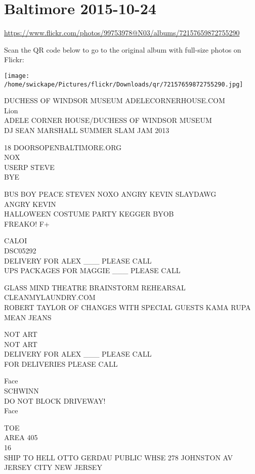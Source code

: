 \documentclass[10pt,letterpaper]{article}
\begin{document}
\section*{Baltimore 2015-10-24}

\url{https://www.flickr.com/photos/99753978@N03/albums/72157659872755290}

Scan the QR code below to go to the original album with full-size photos on Flickr:

\texttt{[image: /home/swickape/Pictures/flickr/Downloads/qr/72157659872755290.jpg]}


DUCHESS OF WINDSOR MUSEUM ADELECORNERHOUSE.COM\\
Lion\\
ADELE CORNER HOUSE/DUCHESS OF WINDSOR MUSEUM\\
DJ SEAN MARSHALL SUMMER SLAM JAM 2013

18 DOORSOPENBALTIMORE.ORG\\
NOX\\
USERP STEVE\\
BYE

BUS BOY PEACE STEVEN NOXO ANGRY KEVIN SLAYDAWG\\
ANGRY KEVIN\\
HALLOWEEN COSTUME PARTY KEGGER BYOB\\
FREAKO!  F+

CALOI\\
DSC05292\\
DELIVERY FOR ALEX \_\_\_ PLEASE CALL\\
UPS PACKAGES FOR MAGGIE \_\_\_ PLEASE CALL

GLASS MIND THEATRE BRAINSTORM REHEARSAL\\
CLEANMYLAUNDRY.COM\\
ROBERT TAYLOR OF CHANGES WITH SPECIAL GUESTS KAMA RUPA\\
MEAN JEANS

NOT ART\\
NOT ART\\
DELIVERY FOR ALEX \_\_\_ PLEASE CALL\\
FOR DELIVERIES PLEASE CALL

Face\\
SCHWINN\\
DO NOT BLOCK DRIVEWAY!\\
Face

TOE\\
AREA 405\\
16\\
SHIP TO HELL OTTO GERDAU PUBLIC WHSE 278 JOHNSTON AV JERSEY CITY NEW JERSEY
\end{document}
